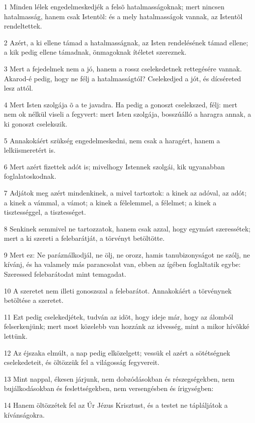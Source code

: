 \par 1 Minden lélek engedelmeskedjék a felsõ hatalmasságoknak; mert nincsen hatalmasság, hanem csak Istentõl: és a mely hatalmasságok vannak, az Istentõl rendeltettek.
\par 2 Azért, a ki ellene támad a hatalmasságnak, az Isten rendelésének támad ellene; a kik pedig ellene támadnak, önmagoknak ítéletet szereznek.
\par 3 Mert a fejedelmek nem a jó, hanem a rossz cselekedetnek rettegésére vannak. Akarod-é pedig, hogy ne félj a hatalmasságtól? Cselekedjed a jót, és dícséreted lesz attól.
\par 4 Mert Isten szolgája õ a te javadra. Ha pedig a gonoszt cselekszed, félj: mert nem ok nélkül viseli a fegyvert: mert Isten szolgája, bosszúálló a haragra annak, a ki gonoszt cselekszik.
\par 5 Annakokáért szükség engedelmeskedni, nem csak a haragért, hanem a lelkiismeretért is.
\par 6 Mert azért fizettek adót is; mivelhogy Istennek szolgái, kik ugyanabban foglalatoskodnak.
\par 7 Adjátok meg azért mindenkinek, a mivel tartoztok: a kinek az adóval, az adót; a kinek a vámmal, a vámot; a kinek a félelemmel, a félelmet; a kinek a tisztességgel, a tisztességet.
\par 8 Senkinek semmivel ne tartozzatok, hanem csak azzal, hogy egymást szeressétek; mert a ki szereti a felebarátját, a törvényt betöltötte.
\par 9 Mert ez: Ne paráználkodjál, ne ölj, ne orozz, hamis tanubizonyságot ne szólj, ne kívánj, és ha valamely más parancsolat van, ebben az ígében foglaltatik egybe: Szeressed felebarátodat mint temagadat.
\par 10 A szeretet nem illeti gonoszszal a felebarátot. Annakokáért a törvénynek betöltése a szeretet.
\par 11 Ezt pedig cselekedjétek, tudván az idõt, hogy ideje már, hogy az álomból felserkenjünk; mert most közelebb van hozzánk az idvesség, mint a mikor hívõkké lettünk.
\par 12 Az éjszaka elmúlt, a nap pedig elközelgett; vessük el azért a sötétségnek cselekedeteit,  és öltözzük fel a világosság fegyvereit.
\par 13 Mint nappal, ékesen járjunk, nem dobzódásokban és részegségekben, nem bujálkodásokban és feslettségekben, nem versengésben és írigységben:
\par 14 Hanem öltözzétek fel az Úr Jézus Krisztust, és a testet ne tápláljátok a kívánságokra.


